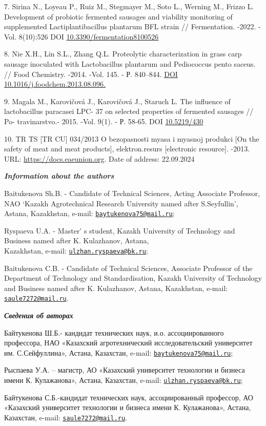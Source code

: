 \begin{references}
7. Sirina N., Loyeau P., Ruiz M., Stegmayer M., Soto L., Werning M.,
Frizzo L. Development of probiotic fermented sausages and viability
monitoring of supplemented Lactiplantibacillus plantarum BFL strain //
Fermentation. -2022. -Vol. 8(10):526
DOI \href{https://doi.org/10.3390/fermentation8100526}{10.3390/fermentation8100526}

8. Nie X.H., Lin S.L., Zhang Q.L. Proteolytic characterization in grass
carp sausage inoculated with Lactobacillus plantarum and Pediococcus
pento saceus. // Food Chemistry. -2014. -Vol. 145. - Р. 840--844.
\href{https://doi.org/10.1016/j.foodchem.2013.08.096}{DOI
10.1016/j.foodchem.2013.08.096.}

9. Magala M., Karovičová J., Karovičová J., Staruch L. The influence of
lactobacillus paracasei LPC- 37 on selected properties of fermented
sausages // Po- travinarstvo.- 2015. -Vol. 9(1). - Р. 58-65. DOI
\href{https://doi.org/10.5219/430}{10.5219/430}

10. TR TS {[}TR CU{]} 034/2013 O bezopasnosti myasa i myasnoj produkci
{[}On the safety of meat and meat products{]}, elektron.resurs
{[}electronic resource{]}. -2013. URL:
\href{https://docs.eaeunion.org/docs/ru-ru/0043629/cncd\_11102013\_68}{https://docs.eaeunion.org}. Date of address: 22.09.2024
\end{references}

\begin{authorinfo}
\emph{{\bfseries Information about the authors}}

Baitukenova Sh.B. - Candidate of Technical Sciences, Acting Associate
Professor, NAO `Kazakh Agrotechnical Research University named after
S.Seyfullin', Astana, Kazakhstan, e-mail:
\href{mailto:baytukenova75@mail.ru}{\nolinkurl{baytukenova75@mail.ru}};

Ryspaeva U.A. - Master' s student, Kazakh University of
Technology and Business named after K. Kulazhanov, Astana, \\Kazakhstan,
e-mail:
\href{mailto:ulzhan.ryspaeva@bk.ru}{\nolinkurl{ulzhan.ryspaeva@bk.ru}};

Baitukenova C.B. - Candidate of Technical Sciences, Associate Professor
of the Department of Technology and Standardisation, Kazakh University
of Technology and Business named after K. Kulazhanov, Astana,
Kazakhstan, e-mail:
\href{mailto:saule7272@mail.ru}{\nolinkurl{saule7272@mail.ru}}.

\emph{{\bfseries Сведения об авторах}}

Байтукенова Ш.Б.- кандидат технических наук, и.о. ассоциированного
профессора, НАО «Казахский агротехнический исследовательский университет
им. С.Сейфуллина», Астана, Казахстан, e-mail:
\href{mailto:baytukenova75@mail.ru}{\nolinkurl{baytukenova75@mail.ru}};

Рыспаева У.А. -- магистр, АО «Казахский университет технологии и бизнеса
имени К. Кулажанова», Астана, Казахстан, e-mail:
\href{mailto:ulzhan.ryspaeva@bk.ru}{\nolinkurl{ulzhan.ryspaeva@bk.ru}};

Байтукенова С.Б.-кандидат технических наук, ассоциированный профессор,
АО «Казахский университет технологии и бизнеса имени К. Кулажанова»,
Астана, Казахстан, e-mail:
\href{mailto:saule7272@mail.ru}{\nolinkurl{saule7272@mail.ru}}.
\end{authorinfo}
